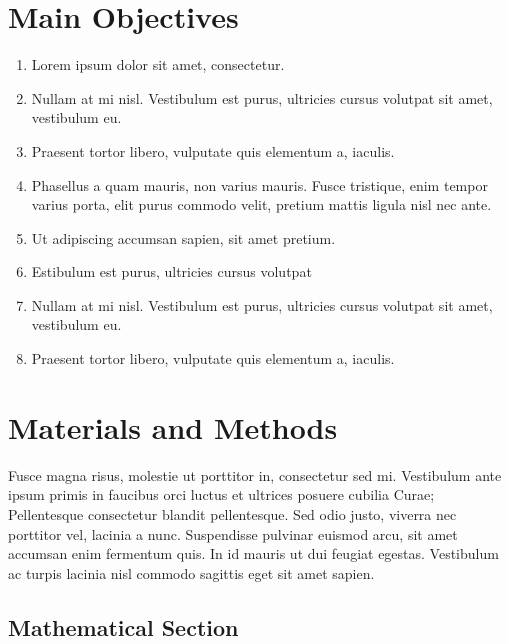 \documentclass[a0,portrait]{a0poster}
\begin{document}
\begin{multicols}{2}
\color{DarkSlateGray} %

\section*{Main Objectives}

\begin{enumerate}
\item Lorem ipsum dolor sit amet, consectetur.
\item Nullam at mi nisl. Vestibulum est purus, ultricies cursus volutpat sit amet, vestibulum eu.
\item Praesent tortor libero, vulputate quis elementum a, iaculis.
\item Phasellus a quam mauris, non varius mauris. Fusce tristique, enim tempor varius porta, elit purus commodo velit, pretium mattis ligula nisl nec ante.
\item Ut adipiscing accumsan sapien, sit amet pretium.
\item Estibulum est purus, ultricies cursus volutpat
\item Nullam at mi nisl. Vestibulum est purus, ultricies cursus volutpat sit amet, vestibulum eu.
\item Praesent tortor libero, vulputate quis elementum a, iaculis.
\end{enumerate}


\section*{Materials and Methods}

Fusce magna risus, molestie ut porttitor in, consectetur sed mi. Vestibulum ante ipsum primis in faucibus orci luctus et ultrices posuere cubilia Curae; Pellentesque consectetur blandit pellentesque. Sed odio justo, viverra nec porttitor vel, lacinia a nunc. Suspendisse pulvinar euismod arcu, sit amet accumsan enim fermentum quis. In id mauris ut dui feugiat egestas. Vestibulum ac turpis lacinia nisl commodo sagittis eget sit amet sapien.


\subsection*{Mathematical Section}


\end{multicols}
\end{document}
